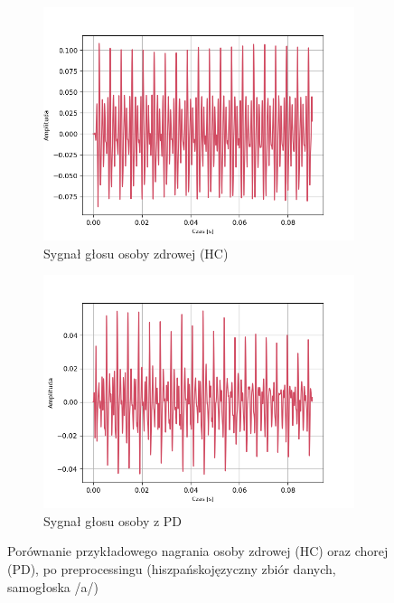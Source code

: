 \begin{figure}[ht]
    \centering
    \begin{subfigure}{0.49\textwidth}
        \centering
        \includegraphics[width=\textwidth]{./img/recordings/HC_a}
        \caption{Sygnał głosu osoby zdrowej (HC)\@}
        \label{fig:recording_HC}
    \end{subfigure}
    \begin{subfigure}{0.49\textwidth}
        \centering
        \includegraphics[width=\textwidth]{./img/recordings/PD_a}
        \caption{Sygnał głosu osoby z PD\@}
        \label{fig:recording_PD}
    \end{subfigure}

    \caption{Porównanie przykładowego nagrania osoby zdrowej (HC) oraz chorej (PD), po preprocessingu (hiszpańskojęzyczny zbiór danych, samogłoska /a/)}
    \label{fig:recordings}
\end{figure}

